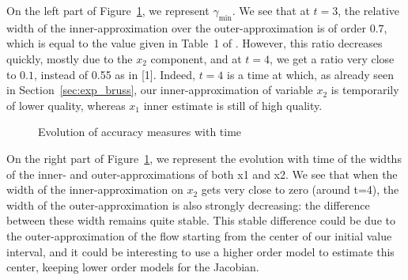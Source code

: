 On the left part of Figure~\ref{ex:width_sriram_bruss}, we represent $\gamma_{\min}$. We see that at $t=3$, the relative width of the inner-approximation over the
outer-approximation is of order $0.7$, which is equal to the value given in Table~1 of \cite{Underapproxflowpipes}. 
However, this ratio decreases quickly, mostly due to the $x_2$ component, and at $t=4$, we get a ratio very close to $0.1$,
instead of 0.55 as in [1]. Indeed, $t=4$ is a time at which, as already seen in Section~\ref{sec:exp_bruss}, our 
inner-approximation of variable $x_2$ is temporarily of lower quality, whereas $x_1$ inner estimate
is still of high quality.
\begin{figure}
\caption{Evolution of accuracy measures with time \label{ex:width_sriram_bruss} }
\end{figure}
On the right part of Figure~\ref{ex:width_sriram_bruss}, we represent the evolution with time of the widths of the inner- and outer-approximations of both x1 and x2. We see that when the width of the inner-approximation on $x_2$ gets very close 
to zero (around t=4), the width of the outer-approximation is also strongly decreasing: the difference between these width remains 
quite stable. This stable difference could be due to the outer-approximation of the flow starting from the center of our 
initial value interval, and it could be interesting to use a higher order model to estimate this center, keeping lower order models for the Jacobian.


